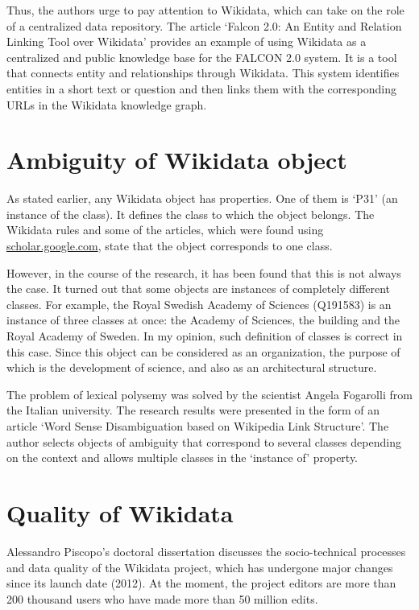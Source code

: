 Thus, the authors urge to pay attention to Wikidata, which can take on the role of a centralized data repository. The article ‘Falcon 2.0: An Entity and Relation Linking Tool over Wikidata' provides an example of using Wikidata as a centralized and public knowledge base for the FALCON 2.0 system. It is a tool that connects entity and relationships through Wikidata. This system identifies entities in a short text or question and then links them with the corresponding URLs in the Wikidata knowledge graph.

\section{Ambiguity of Wikidata object}
As stated earlier, any Wikidata object has properties. One of them is ‘P31’ (an instance of the class). It defines the class to which the object belongs. The Wikidata rules and some of the articles, which were found using \href{scholar.google.com}{scholar.google.com}, state that the object corresponds to one class.

However, in the course of the research, it has been found that this is not always the case. It turned out that some objects are instances of completely different classes. For example, the Royal Swedish Academy of Sciences (Q191583) is an instance of three classes at once: the Academy of Sciences, the building and the Royal Academy of Sweden. In my opinion, such definition of classes is correct in this case. Since this object can be considered as an organization, the purpose of which is the development of science, and also as an architectural structure.

The problem of lexical polysemy was solved by the scientist Angela Fogarolli from the Italian university. The research results were presented in the form of an article ‘Word Sense Disambiguation based on Wikipedia Link Structure’. The author selects objects of ambiguity that correspond to several classes depending on the context and allows multiple classes in the ‘instance of’ property.

\section{Quality of Wikidata}
Alessandro Piscopo's doctoral dissertation discusses the socio-technical processes and data quality of the Wikidata project, which has undergone major changes since its launch date (2012). At the moment, the project editors are more than 200 thousand users who have made more than 50 million edits.

